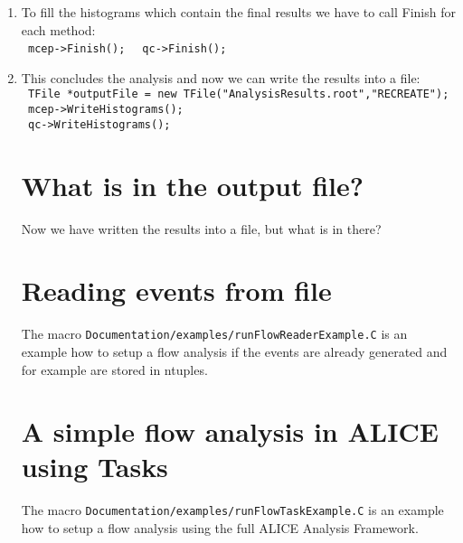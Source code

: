 \begin{enumerate}
For a quick start we make an event on the fly, tag the reference particles and particles of interest  and pass it to the two flow methods. \\
\texttt{for(Int\textunderscore t i=0; i<nEvts; i++) \{}\\
\texttt{      // make an event with mult particles }\\
\texttt{      AliFlowEventSimple* event = new AliFlowEventSimple(mult,AliFlowEventSimple::kGenerate);}\\
\texttt{      // modify the tracks adding the flow value v2}\\
\texttt{       event->AddV2(v2);}\\
\texttt{      // select the particles for the reference flow}\\
\texttt{      event->TagRP(cutsRP);}\\
\texttt{      // select the particles for differential flow}\\
\texttt{      event->TagPOI(cutsPOI);}\\
\texttt{      // do flow analysis with various methods:}\\
\texttt{      mcep->Make(event);}\\
\texttt{      qc->Make(event);}\\
\texttt{    \} // end of for(Int\textunderscore t i=0;i<nEvts;i++)}\\
\item
To fill the histograms which contain the final results we have to call Finish for each method:\\
\texttt{ mcep->Finish(); }  \texttt{ qc->Finish(); }\\
\item
This concludes the analysis and now we can write the results into a file:\\
\texttt{ TFile *outputFile = new TFile("AnalysisResults.root","RECREATE");}\\
\texttt{ mcep->WriteHistograms();}\\
\texttt{ qc->WriteHistograms();}\\

\section{What is in the output file?}
Now we have written the results into a file, but what is in there?

\section{Reading events from file}
The macro \texttt{Documentation/examples/runFlowReaderExample.C} is an example how to setup a flow analysis if the events are already generated and
for example are stored in ntuples.
 
\section{A simple flow analysis in ALICE using Tasks}
The macro \texttt{Documentation/examples/runFlowTaskExample.C} is an example how to setup a flow analysis using the full ALICE Analysis Framework.
\end{enumerate}
